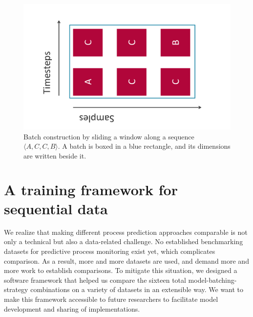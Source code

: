 \begin{figure}[!htb]
    \centering
    \includegraphics[width=.55\textwidth,angle=-90,origin=c]{gfx/windowing-strategy.pdf}
    \caption[Windowing strategy for batches]{Batch construction by sliding a window along a sequence $\langle A,C,C,B\rangle$. A batch is boxed in a blue rectangle, and its dimensions are written beside it.}
    \label{fig:windowing-strategy-example}
\end{figure}

\section{A training framework for sequential data}
\label{sec:contrib:training-framework}
We realize that making different process prediction approaches comparable is not only a technical but also a data-related challenge.
No established benchmarking datasets for predictive process monitoring exist yet, which complicates comparison.
As a result, more and more datasets are used, and demand more and more work to establish comparisons.
To mitigate this situation, we designed a software framework that helped us compare the sixteen total model-batching-strategy combinations on a variety of datasets in an extensible way.
We want to make this framework accessible to future researchers to facilitate model development and sharing of implementations.\\

